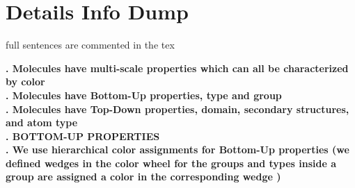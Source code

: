 \documentclass[review,journal]{vgtc}         %
\begin{document}
\section{Details Info Dump}

full sentences are commented in the tex

\textbf{. Molecules have multi-scale properties which can all be characterized by color } \\


\textbf{. Molecules have Bottom-Up properties, type and group} \\


\textbf{. Molecules have Top-Down properties, domain, secondary structures, and atom type} \\


\textbf{. BOTTOM-UP PROPERTIES} \\

\textbf{. We use hierarchical color assignments for Bottom-Up properties (we defined wedges in the color wheel for the groups and types inside a group are assigned a color in the corresponding wedge )} \\

\end{document}
